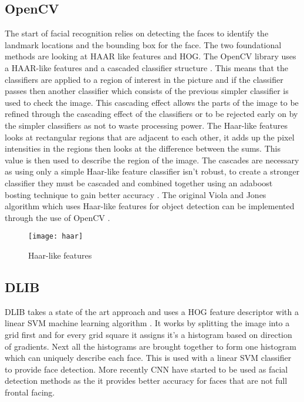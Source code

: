 \documentclass{article}
\begin{document}
\subsection{OpenCV}
The start of facial recognition relies on detecting the faces to identify the landmark locations
and the bounding box for the face. The two foundational methods are looking at HAAR like
features and HOG. The OpenCV library uses a HAAR-like features and a cascaded classifier
structure \cite{Viola2001}. This means that the classifiers are applied to a region of
interest in the picture and if the classifier passes then another classifier which consists of the
previous simpler classifier is used to check the image. This cascading effect allows the parts of
the image to be refined through the cascading effect of the classifiers or to be rejected early
on by the simpler classifiers as not to waste processing power. The Haar-like features looks at
rectangular regions that are adjacent to each other, it adds up the pixel intensities in the
regions then looks at the difference between the sums. This value is then used to describe the
region of the image. The cascades are necessary as using only a simple Haar-like feature
classifier isn’t robust, to create a stronger classifier they must be cascaded and combined
together using an adaboost bosting technique to gain better accuracy \cite{Rahmad2020}.
The original Viola and Jones algorithm which uses Haar-like features for object detection can
be implemented through the use of OpenCV \cite{Naveenkumar2016}.
\begin{figure}[h!]
\centering
\texttt{[image: haar]}
\caption{Haar-like features}
\label{fig:haar}
\end{figure}
\subsection{DLIB}
DLIB takes a state of the art approach and uses a HOG feature descriptor with a linear
SVM machine learning algorithm \cite{Dalal2005}. It works by splitting the image into a
grid first and for every grid square it assigns it’s a histogram based on direction of gradients.
Next all the histograms are brought together to form one histogram which can uniquely
describe each face. This is used with a linear SVM classifier to provide face detection. More
recently CNN have started to be used as facial detection methods as the it provides better
accuracy for faces that are not full frontal facing.
\end{document}
